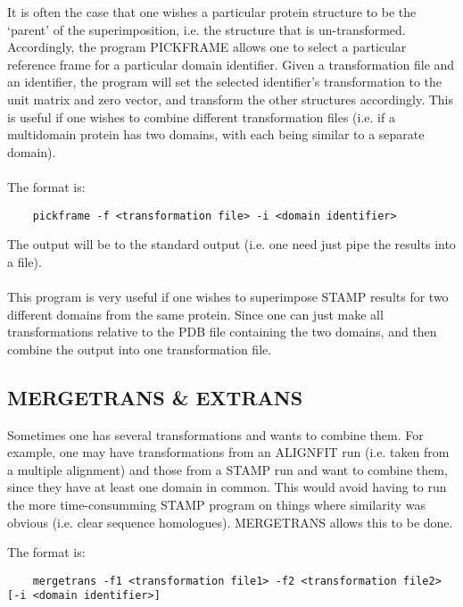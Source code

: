     It is often the case that one wishes a particular protein structure
    to be the `parent' of the superimposition, i.e. the structure that
    is un-transformed.  Accordingly, the program PICKFRAME allows
    one to select a particular reference frame for a particular domain
    identifier.  Given a transformation file and an identifier, the
    program will set the selected identifier's transformation to the
    unit matrix and zero vector, and transform the other structures
    accordingly.  This is useful if one wishes to combine different
    transformation files (i.e. if a multidomain protein has
    two domains, with each being similar to a separate domain).\\
    \\
    The format is:\\

    \begin{scriptsize}\begin{verbatim}
    pickframe -f <transformation file> -i <domain identifier>
    \end{verbatim} \end{scriptsize}

    The output will be to the standard output (i.e. one need just
    pipe the results into a file).  \\
    \\
    This program is very useful if one wishes to superimpose STAMP results
    for two different domains from the same protein.  Since one can just
    make all transformations relative to the PDB file containing the two domains,
    and then combine the output into one transformation file.


    \subsection{MERGETRANS \& EXTRANS}

    Sometimes one has several transformations and wants to combine them.  For example,
    one may have transformations from an ALIGNFIT run (i.e. taken from a multiple alignment) and
    those from a STAMP run and want to combine them, since they have at least one domain 
    in common.  This would avoid having to run the more time-consumming STAMP program on
    things where similarity was obvious (i.e. clear sequence homologues).  MERGETRANS allows this to
    be done.

    The format is:\\

    \begin{scriptsize}\begin{verbatim}
    mergetrans -f1 <transformation file1> -f2 <transformation file2> [-i <domain identifier>]
    \end{verbatim} \end{scriptsize}



